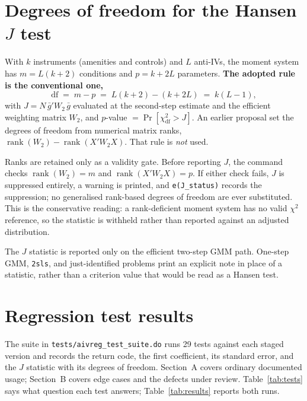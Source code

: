 \documentclass[11pt]{article}
\newcommand{\code}[1]{\texttt{\small #1}}
\begin{document}
\section{Degrees of freedom for the Hansen $J$ test}

With $k$ instruments (amenities and controls) and $L$ anti-IVs, the moment system has
$m = L(k+2)$ conditions and $p = k + 2L$ parameters. \textbf{The adopted rule is the
conventional one,}
\[
  \mathrm{df} \;=\; m - p \;=\; L(k+2) - (k+2L) \;=\; k(L-1),
\]
with $J = N\,\bar{g}'W_2\,\bar{g}$ evaluated at the second-step estimate and the
efficient weighting matrix $W_2$, and $p$-value $= \Pr[\chi^2_{\mathrm{df}} > J]$.
An earlier proposal set the degrees of freedom from numerical matrix ranks,
$\operatorname{rank}(W_2) - \operatorname{rank}(X'W_2X)$. That rule is \emph{not} used.

\noindent Ranks are retained only as a validity gate. Before reporting $J$, the command
checks $\operatorname{rank}(W_2) = m$ and $\operatorname{rank}(X'W_2X) = p$. If either
check fails, $J$ is suppressed entirely, a warning is printed, and \code{e(J\_status)}
records the suppression; no generalised rank-based degrees of freedom are ever
substituted. This is the conservative reading: a rank-deficient moment system has no
valid $\chi^2$ reference, so the statistic is withheld rather than reported against an
adjusted distribution.

\noindent The $J$ statistic is reported only on the efficient two-step GMM path. One-step
GMM, \code{2sls}, and just-identified problems print an explicit note in place of a
statistic, rather than a criterion value that would be read as a Hansen test.

\section{Regression test results}

The suite in \code{tests/aivreg\_test\_suite.do} runs 29 tests against each staged version
and records the return code, the first coefficient, its standard error, and the $J$
statistic with its degrees of freedom. Section~A covers ordinary documented usage;
Section~B covers edge cases and the defects under review. Table~\ref{tab:tests} says
what question each test answers; Table~\ref{tab:results} reports both runs.
\end{document}
